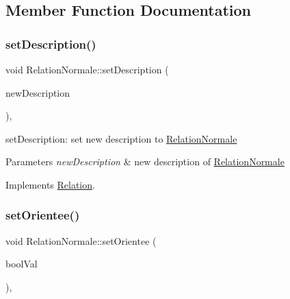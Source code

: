 \subsection{Member Function Documentation}
\mbox{\label{class_relation_normale_a74c586177c06279726df02dd1d8b721a}} 
\subsubsection{\texorpdfstring{set\+Description()}{setDescription()}}
{\footnotesize\ttfamily void Relation\+Normale\+::set\+Description (\begin{DoxyParamCaption}\item[{const Q\+String \&}]{new\+Description }\end{DoxyParamCaption})\hspace{0.3cm}{\ttfamily [inline]}, {\ttfamily [virtual]}}



set\+Description\+: set new description to \hyperlink{class_relation_normale}{Relation\+Normale} 


\begin{DoxyParams}{Parameters}
{\em new\+Description} & new description of \hyperlink{class_relation_normale}{Relation\+Normale} \\
\hline
\end{DoxyParams}


Implements \hyperlink{class_relation_a8f698cc45c38a849c4bcd8336fa5e2b3}{Relation}.

\mbox{\label{class_relation_normale_a6095c88468d08fbe6c3d35fa5aedc635}} 
\subsubsection{\texorpdfstring{set\+Orientee()}{setOrientee()}}
{\footnotesize\ttfamily void Relation\+Normale\+::set\+Orientee (\begin{DoxyParamCaption}\item[{bool}]{bool\+Val }\end{DoxyParamCaption})\hspace{0.3cm}{\ttfamily [inline]}, {\ttfamily [virtual]}}



